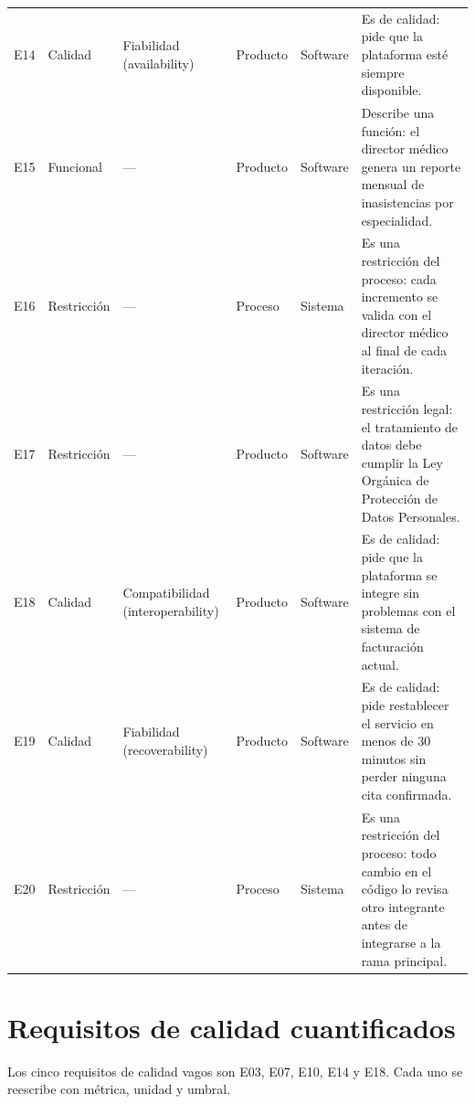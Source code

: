 \documentclass[11pt,a4paper]{article}
\begin{document}
\begin{longtable}{@{}l p{2.3cm} p{5cm} p{2cm} p{2.2cm} p{7.5cm}@{}}
E14 & Calidad & Fiabilidad (availability) & Producto & Software & Es de calidad: pide que la plataforma esté siempre disponible. \\
E15 & Funcional & --- & Producto & Software & Describe una función: el director médico genera un reporte mensual de inasistencias por especialidad. \\
E16 & Restricción & --- & Proceso & Sistema & Es una restricción del proceso: cada incremento se valida con el director médico al final de cada iteración. \\
E17 & Restricción & --- & Producto & Software & Es una restricción legal: el tratamiento de datos debe cumplir la Ley Orgánica de Protección de Datos Personales. \\
E18 & Calidad & Compatibilidad (interoperability) & Producto & Software & Es de calidad: pide que la plataforma se integre sin problemas con el sistema de facturación actual. \\
E19 & Calidad & Fiabilidad (recoverability) & Producto & Software & Es de calidad: pide restablecer el servicio en menos de 30 minutos sin perder ninguna cita confirmada. \\
E20 & Restricción & --- & Proceso & Sistema & Es una restricción del proceso: todo cambio en el código lo revisa otro integrante antes de integrarse a la rama principal. \\
\bottomrule
\end{longtable}
\normalsize
\section{Requisitos de calidad cuantificados}
Los cinco requisitos de calidad vagos son E03, E07, E10, E14 y E18. Cada uno se reescribe con métrica, unidad y umbral.
\end{document}
